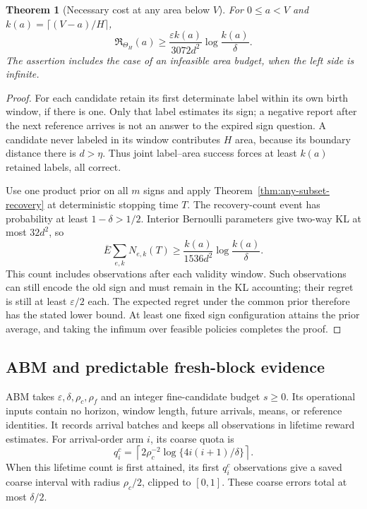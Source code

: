 \documentclass[11pt]{article}
\newtheorem{theorem}{Theorem}[section]
\theoremstyle{remark}
\begin{document}
\begin{theorem}[Necessary cost at any area below $V$]
\label{thm:abm-area-lower}
For $0\le a<V$ and $k(a)=\lceil(V-a)/H\rceil$,
\[
 \mathfrak R_{\Theta_H}(a)\ge
 \frac{\varepsilon k(a)}{3072d^2}\log\frac{k(a)}{\delta}.
\]
The assertion includes the case of an infeasible area budget, when the
left side is infinite.
\end{theorem}
\begin{proof}
For each candidate retain its first determinate label within its own
birth window, if there is one. Only that label estimates its sign; a
negative report after the next reference arrives is not an answer to
the expired sign question. A candidate never labeled in its window
contributes $H$ area, because its boundary distance there is
$d>\eta$. Thus joint label--area success forces at least $k(a)$
retained labels, all correct.

Use one product prior on all $m$ signs and apply
Theorem~\ref{thm:any-subset-recovery} at deterministic stopping time
$T$. The recovery-count event has probability at least
$1-\delta>1/2$. Interior Bernoulli parameters give two-way KL at most
$32d^2$, so
\[
 \overline E\sum_{e,k}N_{e,k}(T)
       \ge\frac{k(a)}{1536d^2}\log\frac{k(a)}{\delta}.
\]
This count includes observations after each validity window. Such
observations can still encode the old sign and must remain in the KL
accounting; their regret is still at least $\varepsilon/2$ each.
The expected regret under the common prior therefore has the stated
lower bound. At least one fixed sign configuration attains the prior
average, and taking the infimum over feasible policies completes the proof.
\end{proof}

\subsection{ABM and predictable fresh-block evidence}

ABM takes $\varepsilon,\delta,\rho_c,\rho_f$ and an integer fine-candidate
budget $s\ge0$. Its operational inputs contain no horizon, window
length, future arrivals, means, or reference identities. It records
arrival batches and keeps all observations in lifetime reward estimates.
For arrival-order arm $i$, its coarse quota is
\[
 q_i^c=\left\lceil2\rho_c^{-2}
                     \log\{4i(i+1)/\delta\}\right\rceil.
\]
When this lifetime count is first attained, its first $q_i^c$ observations
give a saved coarse interval with radius $\rho_c/2$, clipped to $[0,1]$.
These coarse errors total at most $\delta/2$.
\end{document}
